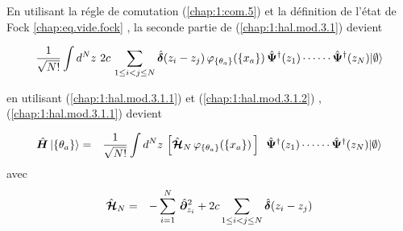 En utilisant la régle de comutation (\ref{chap:1:com.5}) et la définition de l'état de Fock \eqref{chap:eq.vide.fock} , la seconde partie de (\ref{chap:1:hal.mod.3.1}) devient

\begin{eqnarray}
     \frac{1}{ \sqrt{N!}} \int d^N z \,  \,2    c \,\sum_{1\leq i<j\leq N} \hat{\bm{\delta}}(z_i - z_j) \, \varphi_{\{ \theta_a \}} ( \{x_a\}) \, \hat{\bm{\Psi}}^\dag(z_1) \cdots  \cdots\hat{\bm{\Psi}}^\dag(z_N) \vert \emptyset \rangle \label{chap:1:hal.mod.3.1.2}
\end{eqnarray}

en utilisant (\ref{chap:1:hal.mod.3.1.1}) et (\ref{chap:1:hal.mod.3.1.2}) , (\ref{chap:1:hal.mod.3.1.1}) devient

\begin{eqnarray}
    \operator{H}\ket{\{\theta_a\}} &= &  \frac{1}{ \sqrt{N!}} \int d^N z \,      \left [ \operator{\mathcal{H}}_N \, \varphi_{\{ \theta_a \}} ( \{x_a\})\,  \right ] \, \operator{\Psi}^\dag(z_1) \cdots  \cdots\operator{\Psi}^\dag(z_N) \vert \emptyset \rangle
\end{eqnarray}
avec
\begin{eqnarray}
    \hat{\bm{\mathcal{H}}}_N & = &  - \sum_{i=1}^N \, \hat{\bm{\partial}}_{z_i}^2 + 2    c \sum_{1\leq i<j\leq N} \hat{\bm{\delta}}(z_i - z_j)
\end{eqnarray}





